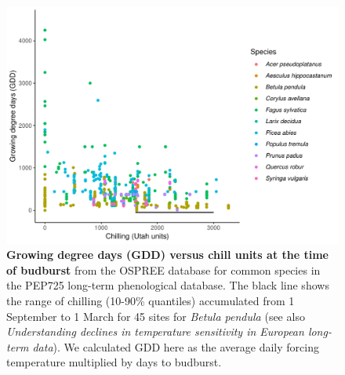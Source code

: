 \documentclass{article}
\begin{document}
\begin{figure}[h!]
\centering
\noindent \includegraphics[width=1\textwidth]{..//..//analyses/bb_analysis/figures/gddbyutah_pepspp.pdf}
\caption{\textbf{Growing degree days (GDD) versus chill units at the time of budburst} from the OSPREE database for common species in the PEP725 long-term phenological database. The black line shows the range of chilling (10-90\% quantiles) accumulated from 1 September to 1 March for 45 sites for \emph{Betula pendula} (see also \emph{Understanding declines in temperature sensitivity in European long-term data}). We calculated GDD here as the average daily forcing temperature multiplied by days to budburst.}
\label{fig:pepgddchill}
\end{figure}

\end{document}
